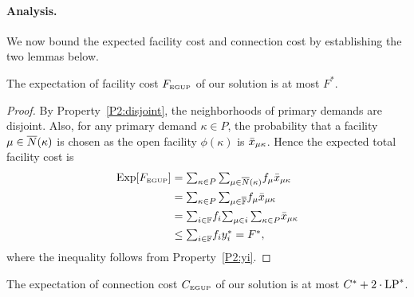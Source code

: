 \documentclass[11pt]{article}
\begin{document}
\paragraph{Analysis.}
We now bound the expected facility cost and connection cost
by establishing the two lemmas below.


\begin{lemma}\label{lemma:3fac}
The expectation of facility cost $F_{\mbox{\tiny\rm EGUP}}$ of our solution is
  at most $F^\ast$.
\end{lemma}

\begin{proof}
By Property~\ref{P2:disjoint}, the neighborhoods of primary demands are disjoint. Also,
  for any primary demand $\kappa\in P$, the probability that
  a facility $\mu\in{\overline{N}}(\kappa)$ is chosen as the open
  facility $\phi(\kappa)$ is ${\bar x}_{\mu\kappa}$. Hence the
  expected total facility cost is
%
\begin{align*}
    \mbox{\rm Exp}[F_{\mbox{\tiny\rm EGUP}}]
	&= \textstyle{\sum_{\kappa\in P}\sum_{\mu\in{\overline{N}}(\kappa)}} f_{\mu} {\bar x}_{\mu\kappa}
	\\
	&= \textstyle{\sum_{\kappa\in P}\sum_{\mu\in\overline{\mathbb{F}}}} f_{\mu} {\bar x}_{\mu\kappa} 
	\\
	&= \textstyle{\sum_{i\in\mathbb{F}}} f_i \textstyle{\sum_{\mu\in i}\sum_{\kappa\in P}} {\bar x}_{\mu\kappa} 
	\\
	&\leq \textstyle{\sum_{i\in\mathbb{F}}} f_i y_i^\ast 
	= F^\ast,
\end{align*}
%
where the inequality follows from Property~\ref{P2:yi}.
\end{proof}


\begin{lemma}\label{lemma:3dist}
The expectation of connection cost $C_{\mbox{\tiny\rm EGUP}}$ of our solution
is at most  $C^\ast+2\cdot\mbox{\rm LP}^\ast$.
\end{lemma}
\end{document}
